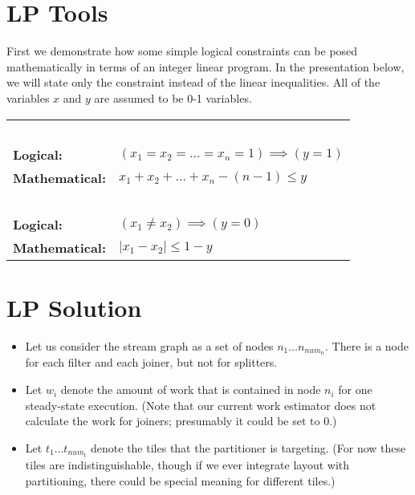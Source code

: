 \documentclass[12pt]{article}
\begin{document}
  \section{LP Tools}
  \label{sec:tools}

  First we demonstrate how some simple logical constraints can be
  posed mathematically in terms of an integer linear program.  In the
  presentation below, we will state only the constraint instead of the
  linear inequalities.  All of the variables $x$ and $y$ are assumed
  to be 0-1 variables.

  \begin{tabular}{ll}
    ~ \\
    {\bf Logical:} & $(x_1 = x_2 = \dots = x_n = 1) \implies (y = 1)$ \\
    {\bf Mathematical:} & $x_1 + x_2 + \dots + x_n - (n - 1) \le y$ \\
    ~ \\
    {\bf Logical:} & $(x_1 \ne x_2) \implies (y = 0)$ \\
    {\bf Mathematical:} & $|x_1 - x_2| \le 1 - y$
  \end{tabular}
  
  \section{LP Solution}


  \begin{itemize}

  \item Let us consider the stream graph as a set of nodes $n_1 \dots
    n_{num_n}$.  There is a node for each filter and each joiner, but not
    for splitters.

  \item Let $w_i$ denote the amount of work that is contained in node
  $n_i$ for one steady-state execution.  (Note that our current work
  estimator does not calculate the work for joiners; presumably it
  could be set to 0.)

  \item Let $t_1 \dots t_{num_t}$ denote the tiles that the partitioner
  is targeting.  (For now these tiles are indistinguishable, though if
  we ever integrate layout with partitioning, there could be special
  meaning for different tiles.)

  \end{itemize}

\end{document}
